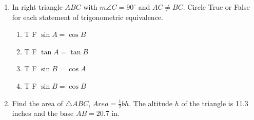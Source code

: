 \documentclass[12pt, twoside]{article}
\begin{document}
\begin{enumerate}
  \item In right triangle $ABC$ with $m\angle C=90^\circ$ and $AC \neq BC$. Circle True or False for each statement of trigonometric equivalence.
       \begin{multicols}{2}
        \begin{enumerate}
        \item \quad T \qquad F \qquad $\sin A = \cos B$ \vspace{0.25cm}
        \item \quad T \qquad F \qquad $\tan A = \tan B$
        \item \quad T \qquad F \qquad $\sin B = \cos A$ \vspace{0.25cm}
        \item \quad T \qquad F \qquad $\sin B = \cos B$
      \end{enumerate}
    \end{multicols}

\newpage

   \item Find the area of $\triangle ABC$,  $Area= \frac{1}{2}bh$. The altitude $h$ of the triangle is 11.3 inches and the base $AB=20.7$ in.\\[0.5cm]
    \vspace{3.0cm}


\end{enumerate}
\end{document}
